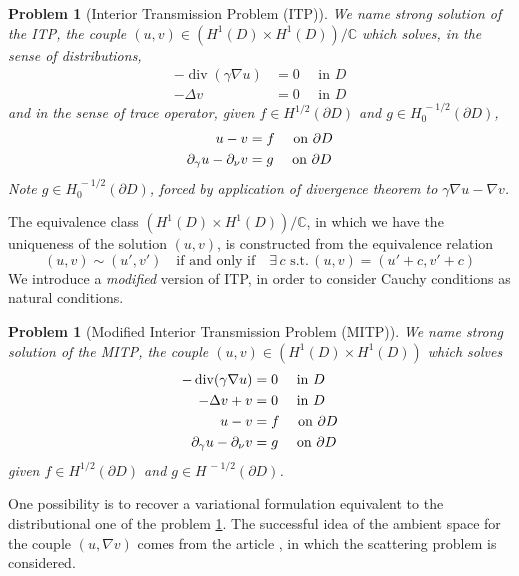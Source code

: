 \documentclass[10pt, a4paper, twoside, openright]{book}
\theoremstyle{definition}
\theoremstyle{plain}
\theoremstyle{plain}
\theoremstyle{plain}
\theoremstyle{plain}
\theoremstyle{plain}
\theoremstyle{plain}
\theoremstyle{plain}
\theoremstyle{plain}
\newtheorem{problem}[subsection]{Problem}
\DeclareMathOperator{\divergence}{div}
\begin{document}
\begin{mybox}
\begin{problem}[Interior Transmission Problem (ITP)]
\label{problem:ITP-dist}
We name \emph{strong solution} of the ITP, the couple {$(u,v) \in (H^1(D) \times H^1(D))/\mathbb{C}$} which solves, in the sense of distributions,
\begin{align}
-\divergence(\gamma\nabla u) & = 0\quad\text{ in }D \\
-\Delta v & = 0 \quad\text{ in }D
\end{align}
and in the sense of trace operator, given $f\in H^{1/2}(\partial D)$ and $g\in H^{\,-1/2}_0(\partial D)$,
\begin{align}
  u - v & = f \quad\textup{ on }\partial D\\
  \partial_\gamma u - \partial_\nu v & = g \quad\textup{ on }\partial D
\end{align}
Note $g\in H^{\,-1/2}_0(\partial D)$, forced by application of divergence theorem to $\gamma\nabla u - \nabla v$.
\end{problem}
\end{mybox}
The equivalence class $(H^1(D) \times H^1(D))/\mathbb{C}$, in which we have the uniqueness of the solution $(u,v)$, is constructed from the equivalence relation
\begin{equation}
 (u,v)\sim(u',v') \quad \text{if and only if} \quad \exists \,c \,\,\text{s.t.}\,(u,v) = (u' + c,v' + c) 
\end{equation}
We introduce a \emph{modified} version of ITP, in order to consider Cauchy conditions as natural conditions.
\begin{mybox}
\begin{problem}[Modified Interior Transmission Problem (MITP)]
\label{problem:MITP-dist}
We name \emph{strong solution} of the MITP, the couple {$(u,v) \in (H^1(D) \times H^1(D))$} which solves
\begin{align}
-\divergence(\gamma\nabla u) & = 0\quad\text{ in }D \\
-\Delta v + v & = 0 \quad\text{ in }D \\
  u - v & = f \quad\textup{ on }\partial D\\
  \partial_\gamma u - \partial_\nu v & = g \quad\textup{ on }\partial D
\end{align}
given $f\in H^{1/2}(\partial D)$ and $g\in H^{\,-1/2}(\partial D)$.
\end{problem}
\end{mybox}
One possibility is to recover a variational formulation equivalent to the distributional one of the problem \ref{problem:MITP-dist}. The successful idea of the ambient space for the couple $(u,\nabla v)$ comes from the article \cite{cakoni-colton-haddar:lsm}, in which the scattering problem is considered.
\end{document}
